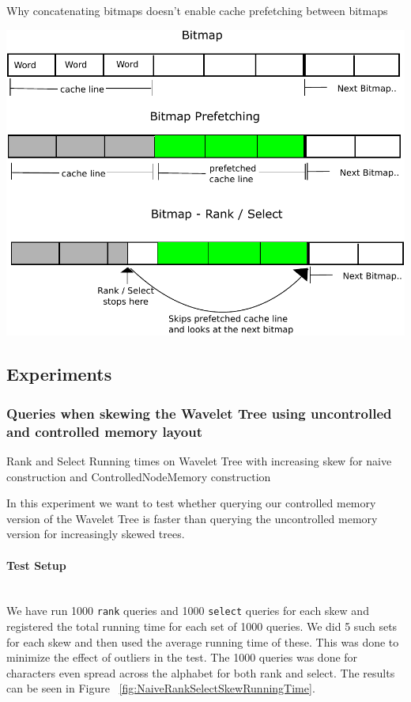 \figureBegin
\caption{Why concatenating bitmaps doesn't enable cache prefetching between bitmaps}
\label{fig:QueryPrefetchFigure}
\includegraphics[width=\textwidth]{QueryPrefetchFigure.pdf}
\figureEnd



\subsection{Experiments}

\subsubsection{Queries when skewing the Wavelet Tree using uncontrolled and controlled memory layout}

\figureBegin
\caption{Rank and Select Running times on Wavelet Tree with increasing skew for naive construction and ControlledNodeMemory construction}
\label{fig:NaiveRankSelectSkewRunningTime}

\figureEnd


In this experiment we want to test whether querying our controlled memory version of the Wavelet Tree is faster than querying the uncontrolled memory version for increasingly skewed trees. 

\paragraph{Test Setup}~\\
We have run 1000 \texttt{rank} queries and 1000 \texttt{select} queries for each skew and registered the total running time for each set of 1000 queries. 
We did 5 such sets for each skew and then used the average running time of these. 
This was done to minimize the effect of outliers in the test. The 1000 queries was done for characters even spread across the alphabet for both rank and select. The results can be seen in Figure ~\ref{fig:NaiveRankSelectSkewRunningTime}.

